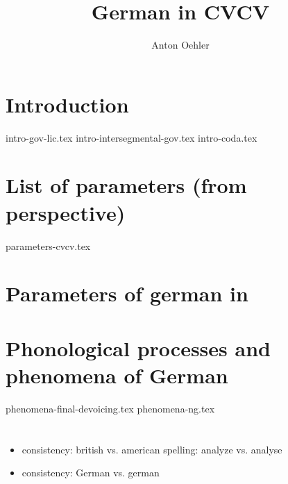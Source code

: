 \documentclass[
]{scrartcl}
\title{German in CVCV}
\author{Anton Oehler}
\begin{document}
\maketitle


\tableofcontents

\section{Introduction}
{intro-gov-lic.tex}
{intro-intersegmental-gov.tex}
{intro-coda.tex}


\section{List of parameters (from \CVCV perspective)}
{parameters-cvcv.tex}

\section{Parameters of german in \CVCV}

\section{Phonological processes and phenomena of German}
{phenomena-final-devoicing.tex}
{phenomena-ng.tex}

\section*{\TODO{}}
\begin{itemize}
\item consistency: british vs. american spelling: analyze vs. analyse
\item consistency: German vs. german
\end{itemize}

\printbibliography
\end{document}
